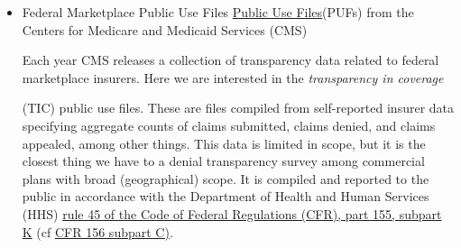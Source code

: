 \documentclass[12pt, a4paper,twoside,parskip=full]{report}
\theoremstyle{plain} %
\theoremstyle{definition} %
\theoremstyle{remark} %
\numberwithin{equation}{chapter}
\begin{document}
		\begin{itemize}
			\item Federal Marketplace Public Use Files \href{https://www.cms.gov/cciio/resources/data-resources/marketplace-puf}{Public Use Files}(PUFs) from the Centers for Medicare and Medicaid Services (CMS)\\
			
			\begin{tcolorbox}
			Each year CMS releases a collection of transparency data related to federal marketplace insurers. Here we are interested in the \emph{transparency in coverage}  
			(TIC) public use files. These are files compiled from self-reported insurer data specifying aggregate counts of claims submitted, claims denied, and claims appealed, among other things. This data is limited in scope, but it is the closest thing we have to a denial transparency survey among commercial plans with broad (geographical) scope. It is compiled and reported to the public in accordance with the Department of Health and Human Services (HHS) \href{https://www.ecfr.gov/current/title-45/subtitle-A/subchapter-B/part-155/subpart-K/section-155.1040}{rule 45 of the Code of Federal Regulations (CFR), part 155, subpart K} (cf \href{https://www.ecfr.gov/current/title-45/subtitle-A/subchapter-B/part-156/subpart-C/section-156.220}{CFR 156 subpart C)}.
			

\end{tcolorbox}
\end{itemize}
\end{document}
